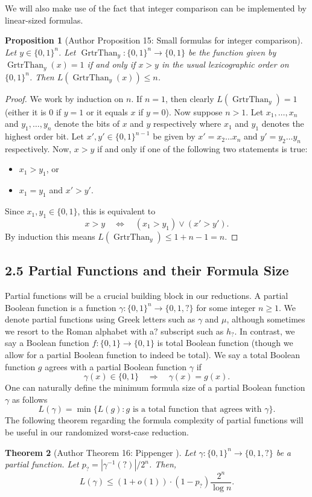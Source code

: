 \documentclass[10pt,a4paper]{article}
\newtheorem{nttheorem}{Theorem}
\newtheorem{ntproposition}[nttheorem]{Proposition}
\begin{document}
We will also make use of the fact that integer comparison can be implemented by linear-sized formulas.
\begin{ntproposition}[Author Proposition 15: Small formulas for integer comparison]
Let $y\in\{0,1\}^n$. Let $\operatorname{GrtrThan}_y:\{0,1\}^n\to\{0,1\}$ be the function given by $\operatorname{GrtrThan}_y(x)=1$ if and only if $x>y$ in the usual lexicographic order on $\{0,1\}^n$. Then $L(\operatorname{GrtrThan}_y(x))\leq n$.
\end{ntproposition}
\begin{proof}
We work by induction on $n$. If $n=1$, then clearly $L(\operatorname{GrtrThan}_y)=1$ (either it is 0 if $y=1$ or it equals $x$ if $y=0$).
Now suppose $n>1$. Let $x_1,\ldots,x_n$ and $y_1,\ldots,y_n$ denote the bits of $x$ and $y$ respectively where $x_1$ and $y_1$ denotes the highest order bit. Let $x',y'\in\{0,1\}^{n-1}$ be given by $x'=x_2\ldots x_n$ and $y'=y_2\ldots y_n$ respectively.
Now, $x>y$ if and only if one of the following two statements is true:
\begin{itemize}\item $x_1>y_1$, or\item $x_1=y_1$ and $x'>y'$.\end{itemize}
Since $x_1,y_1\in\{0,1\}$, this is equivalent to
\[x>y\quad\Longleftrightarrow\quad(x_1>y_1)\lor(x'>y').\]
By induction this means $L(\operatorname{GrtrThan}_y)\leq 1+n-1=n$.
\end{proof}
\subsection*{2.5 Partial Functions and their Formula Size}
Partial functions will be a crucial building block in our reductions. A partial Boolean function is a function $\gamma:\{0,1\}^n\to\{0,1,?\}$ for some integer $n\geq 1$. We denote partial functions using Greek letters such as $\gamma$ and $\mu$, although sometimes we resort to the Roman alphabet with a$?$ subscript such as $h_?$.
In contrast, we say a Boolean function $f:\{0,1\}\to\{0,1\}$ is total Boolean function (though we allow for a partial Boolean function to indeed be total).
We say a total Boolean function $g$ agrees with a partial Boolean function $\gamma$ if
\[\gamma(x)\in\{0,1\}\quad\Longrightarrow\quad\gamma(x)=g(x).\]
One can naturally define the minimum formula size of a partial Boolean function $\gamma$ as follows
\[L(\gamma)=\min\{L(g):g\text{ is a total function that agrees with }\gamma\}.\]
The following theorem regarding the formula complexity of partial functions will be useful in our randomized worst-case reduction.
\begin{nttheorem}[Author Theorem 16: Pippenger {\cite{ref16}}]
Let $\gamma:\{0,1\}^n\to\{0,1,?\}$ be a partial function. Let $p_?=|\gamma^{-1}(?)|/2^n$. Then,
\[L(\gamma)\leq(1+o(1))\cdot(1-p_?)\frac{2^n}{\log n}.\]
\end{nttheorem}
\end{document}
